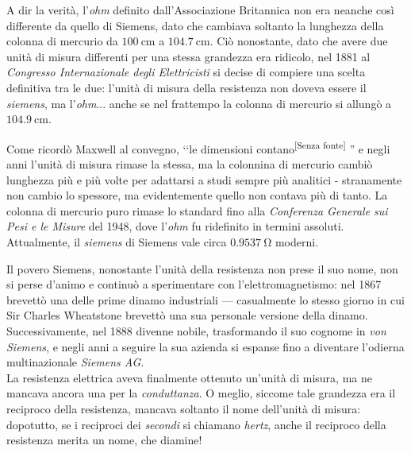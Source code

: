 \begin{digressionwt}
	A dir la verità, l'\textit{ohm} definito dall'Associazione Britannica non era neanche così differente da quello di Siemens, dato che cambiava soltanto la lunghezza della colonna di mercurio da $\SI{100}{\centi\meter}$ a $\SI{104.7}{\centi\meter}$. Ciò nonostante, dato che avere due unità di misura differenti per una stessa grandezza era ridicolo, nel 1881 al \textit{Congresso Internazionale degli Elettricisti} si decise di compiere una scelta definitiva tra le due: l'unità di misura della resistenza non doveva essere il \textit{siemens}, ma l'\textit{ohm}... anche se nel frattempo la colonna di mercurio si allungò a $\SI{104.9}{\centi\meter}$.\newline %
	
	\noindent Come ricordò Maxwell al convegno, ‘‘le dimensioni contano\textsuperscript{[Senza fonte]}%
	 '' e negli anni l'unità di misura rimase la stessa, ma la colonnina di mercurio cambiò lunghezza più e più volte per adattarsi a studi sempre più analitici - stranamente non cambio lo spessore, ma evidentemente quello non contava più di tanto. La colonna di mercurio puro rimase lo standard fino alla \textit{Conferenza Generale sui Pesi e le Misure} del 1948, dove l'\textit{ohm} fu ridefinito in termini assoluti. Attualmente, il \textit{siemens} di Siemens vale circa $\SI{0.9537}{\ohm}$ moderni.
	
	Il povero Siemens, nonostante l'unità della resistenza non prese il suo nome, non si perse d'animo e continuò a sperimentare con l'elettromagnetismo: nel 1867 brevettò una delle prime dinamo industriali --- casualmente lo stesso giorno in cui Sir Charles Wheatstone brevettò una sua personale versione della dinamo. Successivamente, nel 1888 divenne nobile, trasformando il suo cognome in \textit{von Siemens}, e negli anni a seguire la sua azienda si espanse fino a diventare l'odierna multinazionale \textit{Siemens AG}.\newline~\\
	La resistenza elettrica aveva finalmente ottenuto un'unità di misura, ma ne mancava ancora una per la \textit{conduttanza}. O meglio, siccome tale grandezza era il reciproco della resistenza, mancava soltanto il nome dell'unità di misura: dopotutto, se i reciproci dei \textit{secondi} si chiamano \textit{hertz}, anche il reciproco della resistenza merita un nome, che diamine!
	

\end{digressionwt}
